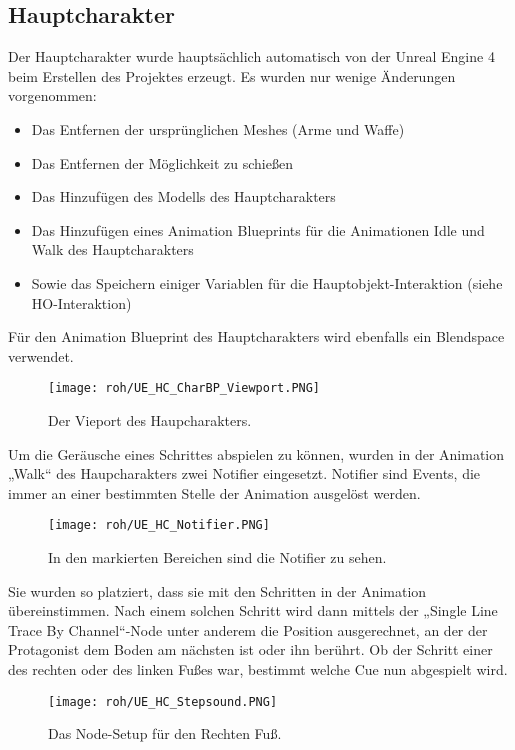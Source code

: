 \subsection{Hauptcharakter}
Der Hauptcharakter wurde hauptsächlich automatisch von der Unreal Engine 4 beim Erstellen des Projektes erzeugt. Es wurden nur wenige Änderungen vorgenommen:
\begin{itemize}
    \item Das Entfernen der ursprünglichen Meshes (Arme und Waffe)
    \item Das Entfernen der Möglichkeit zu schießen
    \item Das Hinzufügen des Modells des Hauptcharakters
    \item Das Hinzufügen eines Animation Blueprints für die Animationen Idle und Walk des Hauptcharakters
    \item Sowie das Speichern einiger Variablen für die Hauptobjekt-Interaktion (siehe HO-Interaktion)
\end{itemize}
Für den Animation Blueprint des Hauptcharakters wird ebenfalls ein Blendspace verwendet.
\begin{figure}[H]
    \centering
    \texttt{[image: roh/UE\_HC\_CharBP\_Viewport.PNG]}
    \caption{Der Vieport des Haupcharakters.}
    \label{UE:HC_CharBP_Viewport}
\end{figure}
Um die Geräusche eines Schrittes abspielen zu können, wurden in der Animation „Walk“ des Haupcharakters zwei Notifier eingesetzt. Notifier sind Events, die immer an einer bestimmten Stelle der Animation ausgelöst werden.
\begin{figure}[H]
    \centering
    \texttt{[image: roh/UE\_HC\_Notifier.PNG]}
    \caption{In den markierten Bereichen sind die Notifier zu sehen.}
    \label{UE:HC_Notifier}
\end{figure}
Sie wurden so platziert, dass sie mit den Schritten in der Animation übereinstimmen. Nach einem solchen Schritt wird dann mittels der „Single Line Trace By Channel“-Node unter anderem die Position ausgerechnet, an der der Protagonist dem Boden am nächsten ist oder ihn berührt.
Ob der Schritt einer des rechten oder des linken Fußes war, bestimmt welche Cue nun abgespielt wird.
\begin{figure}[H]
    \centering
    \texttt{[image: roh/UE\_HC\_Stepsound.PNG]}
    \caption{Das Node-Setup für den Rechten Fuß.}
    \label{UE:HC_Stepsound}
\end{figure}
